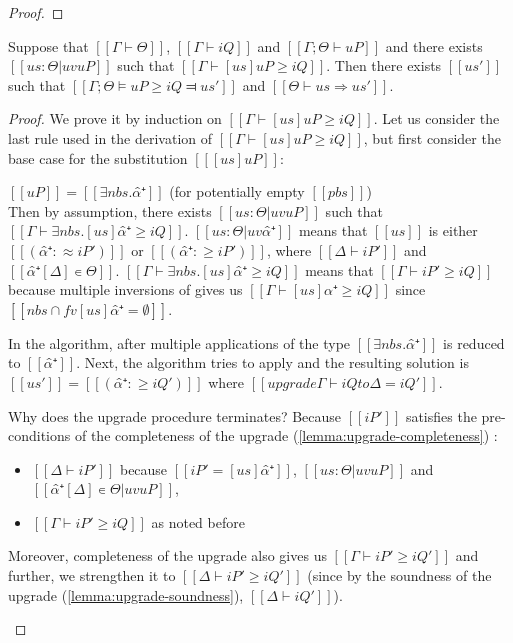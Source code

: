 \begin{theorem} \hfill
\end{theorem}
\begin{proof}
\end{proof}


\begin{lemma} \label{lemma:pos-subt-completeness}
    Suppose that $[[Γ ⊢ Θ]]$, $[[Γ ⊢ iQ]]$ and $[[Γ ; Θ ⊢ uP]]$ and
    there exists $[[us : Θ | uv uP]]$ such that $[[ Γ ⊢ [us]uP ≥ iQ ]]$.
    Then there exists $[[us']]$ such that $[[Γ ; Θ ⊨ uP ≥ iQ ⫤ us']]$
    and $[[Θ ⊢ us ⇒ us']]$.
\end{lemma}
\begin{proof}
    We prove it by induction on $[[ Γ ⊢ [us]uP ≥ iQ ]]$.
    Let us consider the last rule used in the derivation of  $[[ Γ ⊢ [us]uP ≥ iQ ]]$,
    but first consider the base case for the substitution $[[ [us]uP ]]$:

    \begin{caseof}
        \item \label{case:subt-complete-base} $[[uP]] = [[ ∃nbs.α̂⁺ ]]$ (for potentially empty $[[pbs]]$)\\
        Then by assumption, there exists $[[us : Θ | uv uP]]$ such that $[[ Γ ⊢ ∃nbs.[us]α̂⁺ ≥ iQ ]]$.
        $[[us : Θ | uv α̂⁺]]$ means that  $[[us]]$ is either $[[ (α̂⁺ :≈ iP') ]]$ or $[[ (α̂⁺ :≥ iP') ]]$,
        where $[[Δ ⊢ iP']]$ and $[[α̂⁺[Δ] ∊ Θ]]$.
        $[[ Γ ⊢ ∃nbs.[us]α̂⁺ ≥ iQ ]]$ means that $[[Γ ⊢ iP' ≥ iQ]]$
        because multiple inversions of  
        gives us $[[Γ ⊢ [us]α̂⁺ ≥ iQ]]$ since $[[ {nbs} ∩ fv [us]α̂⁺ = ∅]]$.


        In the algorithm, after multiple applications of 
        the type $[[∃nbs.α̂⁺]]$ is reduced to $[[α̂⁺]]$.
        Next, the algorithm tries to apply
        and the resulting solution is $[[us']] = [[(α̂⁺ :≥ iQ')]]$ where
        $[[upgrade Γ ⊢ iQ to Δ = iQ']]$.

        Why does the upgrade procedure terminates?
        Because $[[iP']]$ satisfies the pre-conditions of the completeness of the upgrade
        (\cref{lemma:upgrade-completeness})
        :
        \begin{itemize}
            \item $[[Δ ⊢ iP']]$ because $[[iP' = [us]α̂⁺]]$, $[[us : Θ | uv uP]]$ and 
            $[[α̂⁺[Δ] ∊ Θ | uv uP]]$,
            \item $[[Γ ⊢ iP' ≥ iQ]]$ as noted before
        \end{itemize}
        Moreover, completeness of the upgrade also gives us $[[Γ ⊢ iP' ≥ iQ']]$
        and further, we strengthen it to $[[Δ ⊢ iP' ≥ iQ']]$
        (since by the soundness of the upgrade (\cref{lemma:upgrade-soundness}),
        $[[Δ ⊢ iQ']]$).


\end{caseof}
\end{proof}
